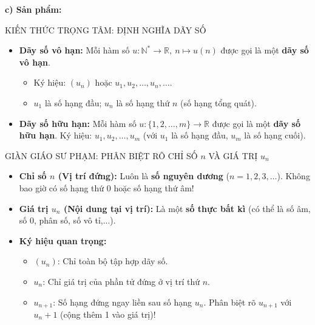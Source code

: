 \documentclass[12pt, a4paper]{article}
\begin{document}
\noindent \textbf{c) Sản phẩm:}  
  
\begin{pedabox}{KIẾN THỨC TRỌNG TÂM: ĐỊNH NGHĨA DÃY SỐ}  
\begin{itemize}[leftmargin=0.6cm]  
    \item \textbf{Dãy số vô hạn:}  
    Mỗi hàm số $u: \mathbb{N}^* \to \mathbb{R},\ n \mapsto u(n)$ được gọi là một \textbf{dãy số vô hạn}.  
    \begin{itemize}  
        \item Ký hiệu: $(u_n)$ hoặc $u_1, u_2, \dots, u_n, \dots$.  
        \item $u_1$ là số hạng đầu; $u_n$ là số hạng thứ $n$ (số hạng tổng quát).  
    \end{itemize}  
    \item \textbf{Dãy số hữu hạn:}  
    Mỗi hàm số $u: \{1, 2, \dots, m\} \to \mathbb{R}$ được gọi là một \textbf{dãy số hữu hạn}.  
    Ký hiệu: $u_1, u_2, \dots, u_m$ (với $u_1$ là số hạng đầu, $u_m$ là số hạng cuối).  
\end{itemize}  
\end{pedabox}  
  
\begin{scaffoldbox}{GIÀN GIÁO SƯ PHẠM: PHÂN BIỆT RÕ CHỈ SỐ $n$ VÀ GIÁ TRỊ $u_n$}  
\begin{itemize}[leftmargin=0.6cm]  
    \item \textbf{Chỉ số $n$ (Vị trí đứng):} Luôn là \textbf{số nguyên dương} ($n = 1, 2, 3, \dots$). Không bao giờ có số hạng thứ 0 hoặc số hạng thứ âm!  
    \item \textbf{Giá trị $u_n$ (Nội dung tại vị trí):} Là một \textbf{số thực bất kì} (có thể là số âm, số 0, phân số, số vô tỉ,...).  
    \item \textbf{Ký hiệu quan trọng:}  
    \begin{itemize}  
        \item $(u_n)$: Chỉ toàn bộ tập hợp dãy số.  
        \item $u_n$: Chỉ giá trị của phần tử đứng ở vị trí thứ $n$.  
        \item $u_{n+1}$: Số hạng đứng ngay liền sau số hạng $u_n$. Phân biệt rõ $u_{n+1}$ với $u_n + 1$ (cộng thêm 1 vào giá trị)!  
    \end{itemize}  
\end{itemize}  
\end{scaffoldbox}  
  
\end{document}

